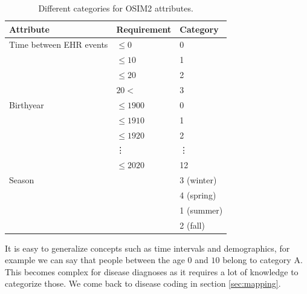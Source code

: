 \begin{table}[!htb]
\centering
\label{tab:catOsim}
\begin{tabular}{lll}
\hline
Attribute                                    & Requirement                      & Category \\ \hline
\multicolumn{1}{l|}{Time between EHR events} & \multicolumn{1}{l|}{$\leq 0$}    & 0        \\
\multicolumn{1}{l|}{}                        & \multicolumn{1}{l|}{$\leq 10$}   & 1        \\
\multicolumn{1}{l|}{}                        & \multicolumn{1}{l|}{$\leq 20$}   & 2        \\
\multicolumn{1}{l|}{}                        & \multicolumn{1}{l|}{$20 <$}      & 3        \\ \hline
\multicolumn{1}{l|}{Birthyear}               & \multicolumn{1}{l|}{$\leq 1900$} & 0        \\
\multicolumn{1}{l|}{}                        & \multicolumn{1}{l|}{$\leq 1910$} & 1        \\
\multicolumn{1}{l|}{}                        & \multicolumn{1}{l|}{$\leq 1920$} & 2        \\
\multicolumn{1}{l|}{}                        & \multicolumn{1}{l|}{\vdots}      & \vdots   \\
\multicolumn{1}{l|}{}                        & \multicolumn{1}{l|}{$\leq 2020$} & 12       \\ \hline
\multicolumn{1}{l|}{Season}                  & \multicolumn{1}{l|}{}            & 3 (winter) \\
\multicolumn{1}{l|}{}                        & \multicolumn{1}{l|}{}            & 4 (spring)   \\
\multicolumn{1}{l|}{}                        & \multicolumn{1}{l|}{}            & 1 (summer)   \\
\multicolumn{1}{l|}{}                        & \multicolumn{1}{l|}{}            & 2 (fall)    \\ \hline
\end{tabular}

\caption{Different categories for OSIM2 attributes.}
\end{table}

It is easy to generalize concepts such as time intervals and demographics, for example we can say that people between the age $0$ and $10$ belong to category A. This becomes complex for disease diagnoses as it requires a lot of knowledge to categorize those. We come back to disease coding in section \ref{sec:mapping}. \\

